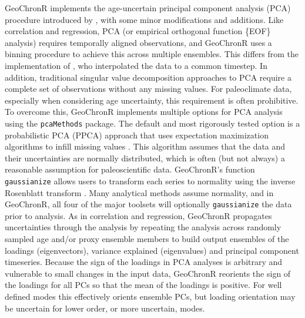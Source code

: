\documentclass[gchron, manuscript]{copernicus}
\begin{document}
GeoChronR implements the age-uncertain principal component analysis (PCA) procedure introduced by \citet{anchukaitis2013mceof}, with some minor modifications and additions.
Like correlation and regression, PCA (or empirical orthogonal function \{EOF\} analysis) requires temporally aligned observations, and GeoChronR uses a binning procedure to achieve this across multiple ensembles.
This differs from the implementation of \citet{anchukaitis2013mceof}, who interpolated the data to a common timestep.
In addition, traditional singular value decomposition approaches to PCA require a complete set of observations without any missing values.
For paleoclimate data, especially when considering age uncertainty, this requirement is often prohibitive.
To overcome this, GeoChronR implements multiple options for PCA analysis using the \texttt{pcaMethods} package.
The default and most rigorously tested option is a probabilistic PCA (PPCA) approach that uses expectation maximization algorithms to infill missing values \citep{roweis1998algorithms}.
This algorithm assumes that the data and their uncertainties are normally distributed, which is often (but not always) a reasonable assumption for paleoscientific data.
GeoChronR's function \texttt{gaussianize} allows users to transform each series to normality using the inverse Rosenblatt transform \citep{vanAlbada2007}.
Many analytical methods assume normality, and in GeoChronR, all four of the major toolsets will optionally \texttt{gaussianize} the data prior to analysis.
As in correlation and regression, GeoChronR propagates uncertainties through the analysis by repeating the analysis across randomly sampled age and/or proxy ensemble members to build output ensembles of the loadings (eigenvectors), variance explained (eigenvalues) and principal component timeseries.
Because the sign of the loadings in PCA analyses is arbitrary and vulnerable to small changes in the input data, GeoChronR reorients the sign of the loadings for all PCs so that the mean of the loadings is positive.
For well defined modes this effectively orients ensemble PCs, but loading orientation may be uncertain for lower order, or more uncertain, modes.
\end{document}
